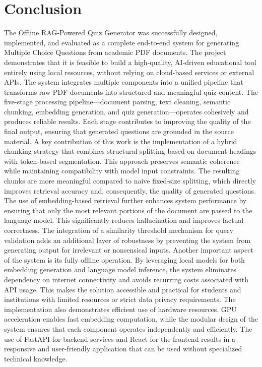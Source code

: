 \documentclass[12pt,a4paper]{report}
\begin{document}
\section{Conclusion}
The Offline RAG-Powered Quiz Generator was successfully designed, implemented, and evaluated as a complete end-to-end system for generating Multiple Choice Questions from academic PDF documents. The project demonstrates that it is feasible to build a high-quality, AI-driven educational tool entirely using local resources, without relying on cloud-based services or external APIs.
The system integrates multiple components into a unified pipeline that transforms raw PDF documents into structured and meaningful quiz content. The five-stage processing pipeline—document parsing, text cleaning, semantic chunking, embedding generation, and quiz generation—operates cohesively and produces reliable results. Each stage contributes to improving the quality of the final output, ensuring that generated questions are grounded in the source material.
A key contribution of this work is the implementation of a hybrid chunking strategy that combines structural splitting based on document headings with token-based segmentation. This approach preserves semantic coherence while maintaining compatibility with model input constraints. The resulting chunks are more meaningful compared to naive fixed-size splitting, which directly improves retrieval accuracy and, consequently, the quality of generated questions.
The use of embedding-based retrieval further enhances system performance by ensuring that only the most relevant portions of the document are passed to the language model. This significantly reduces hallucination and improves factual correctness. The integration of a similarity threshold mechanism for query validation adds an additional layer of robustness by preventing the system from generating output for irrelevant or nonsensical inputs.
Another important aspect of the system is its fully offline operation. By leveraging local models for both embedding generation and language model inference, the system eliminates dependency on internet connectivity and avoids recurring costs associated with API usage. This makes the solution accessible and practical for students and institutions with limited resources or strict data privacy requirements.
The implementation also demonstrates efficient use of hardware resources. GPU acceleration enables fast embedding computation, while the modular design of the system ensures that each component operates independently and efficiently. The use of FastAPI for backend services and React for the frontend results in a responsive and user-friendly application that can be used without specialized technical knowledge.
\end{document}
